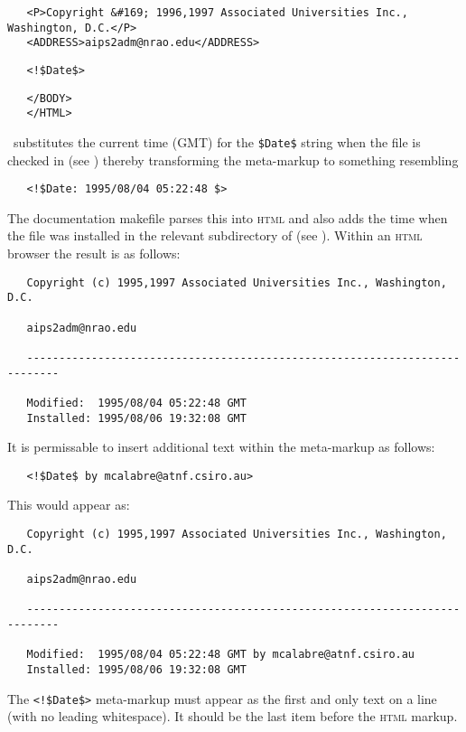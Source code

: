\begin{verbatim}
   <P>Copyright &#169; 1996,1997 Associated Universities Inc., Washington, D.C.</P>
   <ADDRESS>aips2adm@nrao.edu</ADDRESS>
\end{verbatim}

\noindent
\verb+   <!$+\verb+Date$>+

\begin{verbatim}
   </BODY>
   </HTML>
\end{verbatim}

\noindent
\rcs\ substitutes the current time (GMT) for the \verb+$+\verb+Date$+ string
when the file is checked in (see ) thereby transforming the
meta-markup to something resembling

\noindent
\verb+   <!$+\verb+Date: 1995/08/04 05:22:48 $>+

\noindent
The documentation makefile parses this into \textsc{html} and also adds the
time when the  file was installed in the relevant subdirectory of
 (see ).  Within an \textsc{html} browser the
result is as follows:

\begin{verbatim}
   Copyright (c) 1995,1997 Associated Universities Inc., Washington, D.C.

   aips2adm@nrao.edu

   ---------------------------------------------------------------------------

   Modified:  1995/08/04 05:22:48 GMT
   Installed: 1995/08/06 19:32:08 GMT
\end{verbatim}

\noindent
It is permissable to insert additional text within the meta-markup as follows:

\noindent
\verb+   <!$+\verb+Date$ by mcalabre@atnf.csiro.au>+

\noindent
This would appear as:

\begin{verbatim}
   Copyright (c) 1995,1997 Associated Universities Inc., Washington, D.C.

   aips2adm@nrao.edu

   ---------------------------------------------------------------------------

   Modified:  1995/08/04 05:22:48 GMT by mcalabre@atnf.csiro.au
   Installed: 1995/08/06 19:32:08 GMT
\end{verbatim}

\noindent
The \verb+<!$+\verb+Date$>+ meta-markup must appear as the first and only text
on a line (with no leading whitespace).  It should be the last item before the
 \textsc{html} markup.

